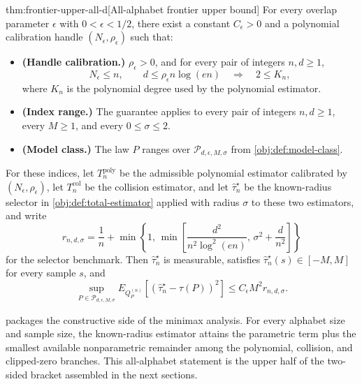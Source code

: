 \begin{theoremv}{thm:frontier-upper-all-d}[All-alphabet frontier upper bound]
For every overlap parameter \(\epsilon\) with \(0<\epsilon<1/2\), there exist a constant \(C_{\epsilon}>0\) and a polynomial calibration handle \((N_{\epsilon},\rho_{\epsilon})\) such that:
\begin{itemize}
\item \textbf{(Handle calibration.)} \(\rho_{\epsilon}>0\), and for every pair of integers \(n,d\ge1\),
\[
N_{\epsilon}\le n,\qquad d\le \rho_{\epsilon} n\log(en)
\quad\Longrightarrow\quad
2\le K_n ,
\]
where \(K_n\) is the polynomial degree used by the polynomial estimator.
\item \textbf{(Index range.)} The guarantee applies to every pair of integers \(n,d\ge1\), every \(M\ge1\), and every \(0\le\sigma\le2\).
\item \textbf{(Model class.)} The law \(P\) ranges over \(\mathcal P_{d,\epsilon,M,\sigma}\) from \cref{obj:def:model-class}.
\end{itemize}
For these indices, let \(T_n^{\mathrm{poly}}\) be the admissible polynomial estimator calibrated by \((N_{\epsilon},\rho_{\epsilon})\), let \(T_n^{\mathrm{col}}\) be the collision estimator, and let \(\widehat\tau_n^{\star}\) be the known-radius selector in \cref{obj:def:total-estimator} applied with radius \(\sigma\) to these two estimators, and write
\[
r_{n,d,\sigma}
=
\frac{1}{n}
+
\min\left\{
1,\,
\min\left[
\frac{d^2}{n^2\log^2(en)},\,
\sigma^2+\frac{d}{n^2}
\right]
\right\}
\]
for the selector benchmark. Then \(\widehat\tau_n^{\star}\) is measurable, satisfies \(\widehat\tau_n^{\star}(s)\in[-M,M]\) for every sample \(s\), and
\[
\sup_{P\in\mathcal P_{d,\epsilon,M,\sigma}}
E_{Q_P^{(n)}}\!\left[\left(\widehat\tau_n^{\star}-\tau(P)\right)^2\right]
\le
C_{\epsilon}M^2 r_{n,d,\sigma}.
\]
\end{theoremv}

 packages the constructive side of the minimax analysis. For every alphabet size and sample size, the known-radius estimator attains the parametric term plus the smallest available nonparametric remainder among the polynomial, collision, and clipped-zero branches. This all-alphabet statement is the upper half of the two-sided bracket assembled in the next sections.
